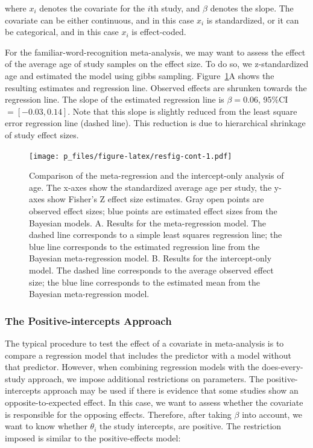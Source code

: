 \documentclass[english,,man]{apa6}
\begin{document}
where \(x_i\) denotes the covariate for the \(i\)th study, and \(\beta\) denotes the slope. The covariate can be either continuous, and in this case \(x_i\) is standardized, or it can be categorical, and in this case \(x_i\) is effect-coded.

For the familiar-word-recognition meta-analysis, we may want to assess the effect of the average age of study samples on the effect size. To do so, we z-standardized age and estimated the model using gibbs sampling. Figure~\ref{fig:resfig-cont}A shows the resulting estimates and regression line. Observed effects are shrunken towards the regression line. The slope of the estimated regression line is \(\beta = 0.06\), 95\%CI \(= [-0.03, 0.14]\). Note that this slope is slightly reduced from the least square error regression line (dashed line). This reduction is due to hierarchical shrinkage of study effect sizes.

\begin{figure}
\centering
\texttt{[image: p\_files/figure-latex/resfig-cont-1.pdf]}
\caption{\label{fig:resfig-cont}Comparison of the meta-regression and the intercept-only analysis of age. The x-axes show the standardized average age per study, the y-axes show Fisher's Z effect size estimates. Gray open points are observed effect sizes; blue points are estimated effect sizes from the Bayesian models. A. Results for the meta-regression model. The dashed line corresponds to a simple least squares regression line; the blue line corresponds to the estimated regression line from the Bayesian meta-regression model. B. Results for the intercept-only model. The dashed line corresponds to the average observed effect size; the blue line corresponds to the estimated mean from the Bayesian meta-regression model.}
\end{figure}

\hypertarget{the-positive-intercepts-approach}{%
\subsubsection{The Positive-intercepts Approach}\label{the-positive-intercepts-approach}}

The typical procedure to test the effect of a covariate in meta-analysis is to compare a regression model that includes the predictor with a model without that predictor. However, when combining regression models with the does-every-study approach, we impose additional restrictions on parameters. The positive-intercepts approach may be used if there is evidence that some studies show an opposite-to-expected effect. In this case, we want to assess whether the covariate is responsible for the opposing effects. Therefore, after taking \(\beta\) into account, we want to know whether \(\theta_i\) the study intercepts, are positive. The restriction imposed is similar to the positive-effects model:
\end{document}

